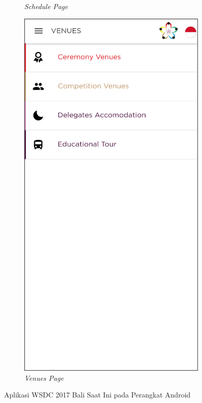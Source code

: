 \begin{figure}[H]
\begin{subfigure}[b]{0.24\textwidth}
	    \caption{{\it Schedule Page}}
	    \label{fig:wsdcAppSchedule}
     \end{subfigure}
	\begin{subfigure}[b]{0.24\textwidth}
    \centering
	    \includegraphics[scale=0.37]{Gambar/VenuePage.png}
	    \caption{\textit{Venues Page}}
	    \label{fig:wsdcAppVenues} 
     \end{subfigure}
	\caption{Aplikasi WSDC 2017 Bali Saat Ini pada Perangkat Android}
        \label{fig:ssAppWSDC2017Bali2}
\end{figure}

